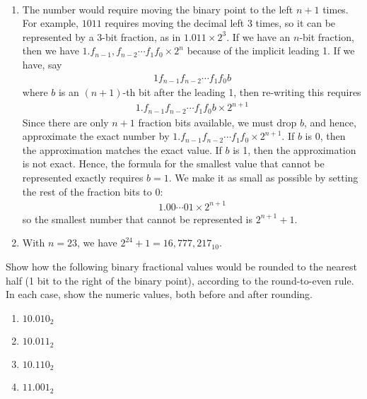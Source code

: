 \documentclass[12pt]{article}
\newenvironment{ex}[2][Exercise]{\begin{trivlist}
		\item[\hskip \labelsep {\bfseries #1}\hskip \labelsep {\bfseries #2.}]}{\end{trivlist}}
\newenvironment{sol}[1][Solution]{\begin{trivlist}
		\item[\hskip \labelsep {\bfseries #1:}]}{\end{trivlist}}
\begin{document}
\begin{sol}
	\
	\begin{enumerate}[label=(\alph*)]
		\item The number would require moving the binary point to the left $n+1$ times.
		For example, $1011$ requires moving the decimal left 3 times, so it can be
		represented by a 3-bit fraction, as in $1.011\times 2^3$. If we have an
		$n$-bit fraction, then we have $1.f_{n-1},f_{n-2}\cdots f_1f_{0}\times 2^{n}$ because
		of the implicit leading 1. If we have, say
		\begin{align*}
			1f_{n-1}f_{n-2}\cdots f_1f_0b
		\end{align*}
		where $b$ is an $(n+1)$-th bit after the leading 1, then re-writing this requires
		\begin{align*}
			1.f_{n-1}f_{n-2}\cdots f_1f_0b\times 2^{n+1}
		\end{align*}
		Since there are only $n+1$ fraction bits available, we must drop $b$, and hence,
		approximate the exact number by $1.f_{n-1}f_{n-2}\cdots f_1f_0\times 2^{n+1}$.
		If $b$ is 0, then the approximation matches the exact value. If $b$ is 1, then
		the approximation is not exact. Hence, the formula for the smallest value that
		cannot be represented exactly requires $b=1$. We make it as small as possible
		by setting the rest of the fraction bits to 0:
		\begin{align*}
			1.00\cdots 01\times 2^{n+1}
		\end{align*}
		so the smallest number that cannot be represented is $2^{n+1}+1$.
		\item With $n=23$, we have $2^{24}+1=16,777,217_{10}$.
	\end{enumerate}
\end{sol}

\begin{ex}{2.50}
	Show how the following binary fractional values would be rounded to the nearest
	half (1 bit to the right of the binary point), according to the round-to-even
	rule. In each case, show the numeric values, both before and after rounding.
	\begin{enumerate}[label=(\alph*)]
		\item $10.010_2$
		\item $10.011_2$
		\item $10.110_2$
		\item $11.001_2$
	\end{enumerate}
\end{ex}
\end{document}
